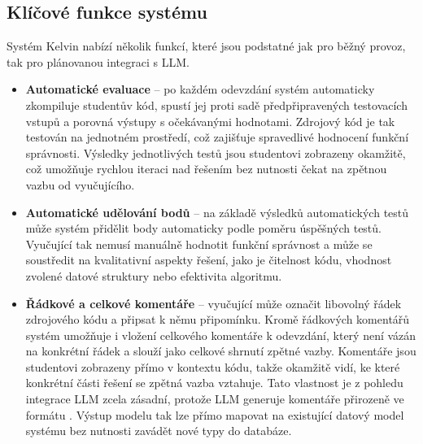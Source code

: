\subsection{Klíčové funkce systému}
\label{subsec:kelvin-features}

Systém Kelvin nabízí několik funkcí, které jsou podstatné jak pro běžný provoz, tak pro plánovanou integraci s LLM\@.

\begin{itemize}
    \item \textbf{Automatické evaluace} -- po každém odevzdání systém automaticky zkompiluje studentův kód, spustí jej proti sadě předpřipravených testovacích vstupů a porovná výstupy s očekávanými hodnotami.
    Zdrojový kód je tak testován na jednotném prostředí, což zajišťuje spravedlivé hodnocení funkční správnosti.
    Výsledky jednotlivých testů jsou studentovi zobrazeny okamžitě, což umožňuje rychlou iteraci nad řešením bez nutnosti čekat na zpětnou vazbu od vyučujícího.

    \item \textbf{Automatické udělování bodů} -- na základě výsledků automatických testů může systém přidělit body automaticky podle poměru úspěšných testů.
    Vyučující tak nemusí manuálně hodnotit funkční správnost a může se soustředit na kvalitativní aspekty řešení, jako je čitelnost kódu, vhodnost zvolené datové struktury nebo efektivita algoritmu.

    \item \textbf{Řádkové a celkové komentáře} -- vyučující může označit libovolný řádek zdrojového kódu a připsat k němu připomínku.
    Kromě řádkových komentářů systém umožňuje i vložení celkového komentáře k odevzdání, který není vázán na konkrétní řádek a slouží jako celkové shrnutí zpětné vazby.
    Komentáře jsou studentovi zobrazeny přímo v kontextu kódu, takže okamžitě vidí, ke které konkrétní části řešení se zpětná vazba vztahuje.
    Tato vlastnost je z pohledu integrace LLM zcela zásadní, protože LLM generuje komentáře přirozeně ve formátu .
    Výstup modelu tak lze přímo mapovat na existující datový model systému bez nutnosti zavádět nové typy do databáze.
\end{itemize}

\endinput
